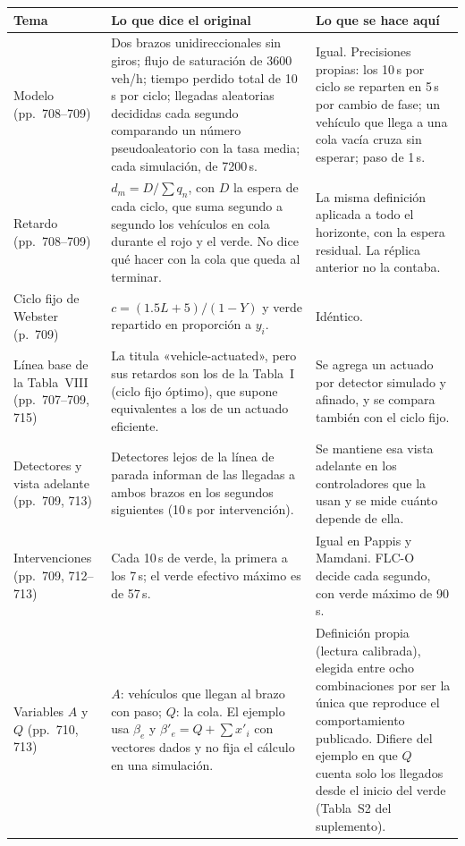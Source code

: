 \documentclass[11pt,a4paper]{article}
\begin{document}
{\footnotesize
\setlength{\LTpre}{2pt}
\begin{longtable}{@{}p{2.3cm}p{6.5cm}p{6.4cm}@{}}
\toprule
Tema & Lo que dice el original & Lo que se hace aquí \\
\midrule
\endhead
Modelo (pp.~708--709) & Dos brazos unidireccionales sin giros; flujo de saturación de 3600\,veh/h; tiempo perdido total de 10\,s por ciclo; llegadas aleatorias decididas cada segundo comparando un número pseudoaleatorio con la tasa media; cada simulación, de 7200\,s. & Igual. Precisiones propias: los 10\,s por ciclo se reparten en 5\,s por cambio de fase; un vehículo que llega a una cola vacía cruza sin esperar; paso de 1\,s. \\
Retardo (pp.~708--709) & $d_m=D/\sum q_n$, con $D$ la espera de cada ciclo, que suma segundo a segundo los vehículos en cola durante el rojo y el verde. No dice qué hacer con la cola que queda al terminar. & La misma definición aplicada a todo el horizonte, con la espera residual. La réplica anterior no la contaba. \\
Ciclo fijo de Webster (p.~709) & $c=(1.5L+5)/(1-Y)$ y verde repartido en proporción a $y_i$. & Idéntico. \\
Línea base de la Tabla~VIII (pp.~707--709, 715) & La titula «vehicle-actuated», pero sus retardos son los de la Tabla~I (ciclo fijo óptimo), que supone equivalentes a los de un actuado eficiente. & Se agrega un actuado por detector simulado y afinado, y se compara también con el ciclo fijo. \\
Detectores y vista adelante (pp.~709, 713) & Detectores lejos de la línea de parada informan de las llegadas a ambos brazos en los segundos siguientes (10\,s por intervención). & Se mantiene esa vista adelante en los controladores que la usan y se mide cuánto depende de ella. \\
Intervenciones (pp.~709, 712--713) & Cada 10\,s de verde, la primera a los 7\,s; el verde efectivo máximo es de 57\,s. & Igual en Pappis y Mamdani. FLC-O decide cada segundo, con verde máximo de 90\,s. \\
Variables $A$ y $Q$ (pp.~710, 713) & $A$: vehículos que llegan al brazo con paso; $Q$: la cola. El ejemplo usa $\beta_e$ y $\beta'_e=Q+\sum x'_i$ con vectores dados y no fija el cálculo en una simulación. & Definición propia (lectura calibrada), elegida entre ocho combinaciones por ser la única que reproduce el comportamiento publicado. Difiere del ejemplo en que $Q$ cuenta solo los llegados desde el inicio del verde (Tabla~S2 del suplemento). \\

\end{longtable}}
\end{document}
